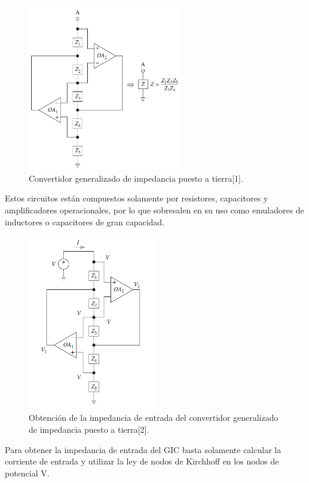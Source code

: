 \documentclass[a4paper]{article}
\begin{document}
\begin{figure} [H]
	\centering
	\includegraphics[width=0.6\textwidth]{Imagenes/gic.PNG}
	\caption{Convertidor generalizado de impedancia puesto a tierra[1].}
	\label{fig:gic}
\end{figure}

Estos circuitos están compuestos solamente por resistores, capacitores y amplificadores operacionales, por lo que sobresalen en su uso como emuladores de inductores o capacitores de gran capacidad.

\begin{figure}[H]
	\centering
	\includegraphics[width=0.5\textwidth]{Imagenes/gic_zin.PNG}
	\caption{Obtención de la impedancia de entrada del convertidor generalizado de impedancia puesto a tierra[2].}
	\label{fig:gic_zin}
\end{figure}

Para obtener la impedancia de entrada del GIC basta solamente calcular la corriente de entrada y utilizar la ley de nodos de Kirchhoff en los nodos de potencial V.
\end{document}
